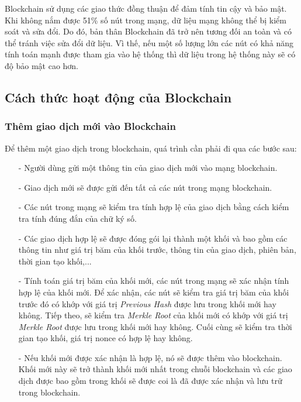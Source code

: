 Blockchain sử dụng các giao thức đồng thuận để đảm tính tin cậy và bảo mật. Khi không nắm được 51\% 
số nút trong mạng, dữ liệu mạng không thể bị kiểm soát và sửa đổi. Do đó, 
bản thân Blockchain đã trở nên tương đối an toàn và có thể tránh việc sửa đổi 
dữ liệu. Vì thế, nếu một số lượng lớn các nút có khả năng tính toán mạnh được 
tham gia vào hệ thống thì dữ liệu trong hệ thống này sẽ có độ bảo mật cao hơn.  



\subsection{Cách thức hoạt động của Blockchain}
\subsubsection{Thêm giao dịch mới vào Blockchain}
Để thêm một giao dịch trong blockchain, quá trình cần phải đi qua các bước sau:
\begin{itemize}
    \item[-] Người dùng gửi một thông tin của giao dịch mới vào mạng blockchain.
    \item[-] Giao dịch mới sẽ được gửi đến tất cả các nút trong mạng blockchain.
    \item[-] Các nút trong mạng sẽ kiểm tra tính hợp lệ của giao dịch bằng cách kiểm tra tính 
    đúng đắn của chữ ký số.
    \item[-] Các giao dịch hợp lệ sẽ được đóng gói lại thành một khối và bao gồm các thông tin 
    như giá trị băm của khối trước, thông tin của giao dịch, phiên bản, thời gian tạo khối,... 
    \item[-] Tính toán giá trị băm của khối mới, các nút trong mạng sẽ xác nhận tính hợp 
    lệ của khối mới. Để xác nhận, các nút sẽ kiểm tra giá trị băm của khối trước đó có khớp 
    với giá trị \textit{Previous Hash} được lưu trong khối mới hay không. Tiếp theo, sẽ kiểm tra \textit{Merkle Root}
    của khối mới có khớp với giá trị \textit{Merkle Root} được lưu trong khối mới hay không. Cuối cùng sẽ 
    kiểm tra thời gian tạo khối, giá trị nonce có hợp lệ hay không. 
    \item[-] Nếu khối mới được xác nhận là hợp lệ, nó sẽ được thêm vào blockchain. Khối mới này sẽ trở thành khối 
    mới nhất trong chuỗi blockchain và các giao dịch được bao gồm trong khối sẽ được coi là đã được xác nhận và 
    lưu trữ trong blockchain.
\end{itemize}

